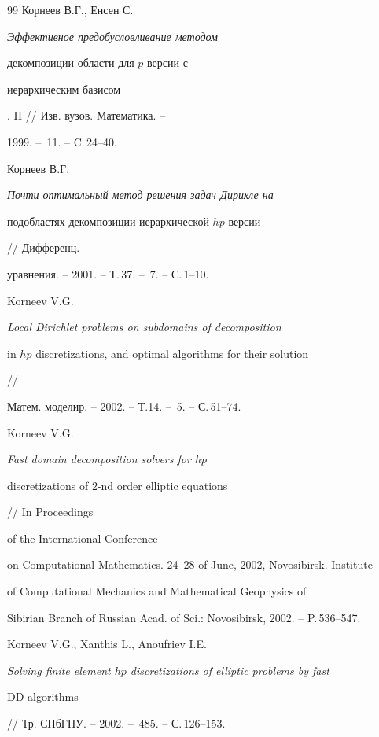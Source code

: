 \begin{thebibliography}{99}
Корнеев В.Г., Енсен С. {\it Эффективное предобусловливание методом 


декомпозиции области для $p$-версии с


иерархическим базисом}. II // Изв. вузов. Математика. --


1999. -- \No\,11. -- C.\,24--40.







Корнеев В.Г. {\it Почти оптимальный метод решения задач Дирихле на 


подобластях декомпозиции иерархической $hp$-версии} // Дифференц. 


уравнения. -- 2001. -- Т.\,37. -- \No\,7. -- С.\,1--10.







Korneev V.G. {\it Local Dirichlet problems on subdomains of decomposition 


in $hp$ discretizations, and optimal algorithms for their solution} //


Матем. моделир. -- 2002. -- Т.14. -- \No\,5. -- С.\,51--74.







Korneev V.G. {\it Fast domain decomposition solvers for $hp$ 


discretizations of $2$-nd order elliptic equations} // In Proceedings 


of the International Conference


on Computational Mathematics. 24--28 of June, 2002, Novosibirsk. Institute 


of Computational Mechanics and Mathematical Geophysics of


Sibirian Branch of Russian Acad. of Sci.: Novosibirsk, 2002. -- P.\,536--547.







Korneev V.G., Xanthis L., Anoufriev I.E.


{\it Solving finite element $hp$ discretizations of elliptic problems by fast 


DD algorithms} // Тр. СПбГПУ. -- 2002. -- \No\,485. -- С.\,126--153.






\end{thebibliography}
